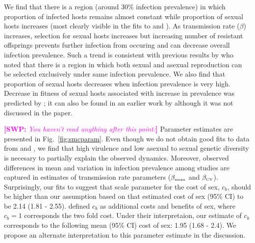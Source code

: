 \documentclass{article}\usepackage[]{graphicx}\usepackage[]{color}
\newcommand{\comment}[3]{\textcolor{#1}{\textbf{[#2: }\textit{#3}\textbf{]}}}
\newcommand{\swp}[1]{\comment{magenta}{SWP}{#1}}
\newcommand{\fref}[1]{Fig.~\ref{fig:#1}}
\begin{document}
We find that there is a region (around 30\% infection prevalence) in which proportion of infected hosts remains almost constant while proportion of sexual hosts increases (most clearly visible in the fits to \cite{mckone2016fine} and \cite{vergara2014infection}).
As transmission rate ($\beta$) increases, selection for sexual hosts increases but increasing number of resistant offsprings prevents further infection from occuring and can decrease overall infection prevalence.
Such a trend is consistent with previous results by \cite{lively2001trematode} who noted that there is a region in which both sexual and asexual reproduction can be selected exclusively under same infection prevalence.
We also find that proportion of sexual hosts decreases when infection prevalence is very high.
Decrease in fitness of sexual hosts associated with increase in prevalence was predicted by \cite{ashby2015diversity}; 
it can also be found in an earlier work by \cite{lively2010epidemiological} although it was not discussed in the paper.

\swp{You haven't read anything after this point:}
Parameter estimates are presented in \fref{smcparam}.
Even though we do not obtain good fits to data from \cite{dagan2013clonal} and \cite{mckone2016fine}, we find that high virulence and low asexual to sexual genetic diversity is necesary to partially explain the observed dynamics.
Moreover, observed differences in mean and variation in infection prevalence among studies are captured in estimates of transmission rate parameters ($\beta_{\textrm{\tiny mean}}$ and $\beta_{\textrm{\tiny CV}}$).
Surprisingly, our fits to \cite{mckone2016fine} suggest that scale parameter for the cost of sex, $c_b$, should be higher than our assumption based on \cite{gibson2017two} that estimated cost of sex (95\% CI) to be 2.14 (1.81 - 2.55).
\cite{ashby2015diversity} defined $c_b$ as additional costs and benefits of sex, where $c_b=1$ corresponds the two fold cost.
Under their interpretaion, our estimate of $c_b$ corresponds to the following mean (95\% CI) cost of sex: 1.95 (1.68 - 2.4).
We propose an alternate interpretation to this parameter estimate in the discussion.
\end{document}

